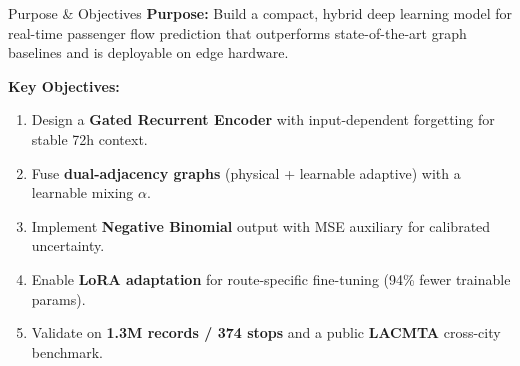 \documentclass[aspectratio=169, 11pt]{beamer}
\begin{document}
\begin{frame}{Purpose \& Objectives}
\vspace{0.3em}
\textbf{Purpose:} Build a compact, hybrid deep learning model for \textcolor{accent}{real-time passenger flow prediction} that outperforms state-of-the-art graph baselines and is deployable on edge hardware.

\vspace{0.8em}
\textbf{Key Objectives:}
\begin{enumerate}
  \item Design a \textbf{Gated Recurrent Encoder} with input-dependent forgetting for stable 72h context.
  \item Fuse \textbf{dual-adjacency graphs} (physical + learnable adaptive) with a learnable mixing $\alpha$.
  \item Implement \textbf{Negative Binomial} output with MSE auxiliary for calibrated uncertainty.
  \item Enable \textbf{LoRA adaptation} for route-specific fine-tuning (94\% fewer trainable params).
  \item Validate on \textbf{1.3M records / 374 stops} and a public \textbf{LACMTA} cross-city benchmark.
\end{enumerate}
\end{frame}

\end{document}

